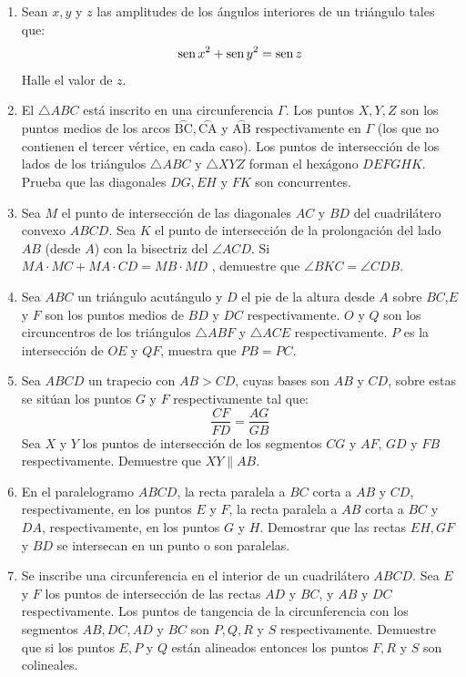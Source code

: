 \documentclass{book}
\newcommand{\sen}{\mathop{\rm sen}\nolimits} %
\begin{document}
\begin{enumerate}
        \item Sean $x,y$ y $z$ las amplitudes de los ángulos interiores de un triángulo tales que:
        $$\sen{x^2}+\sen{y^2}=\sen{z}$$
        Halle el valor de $z$.
        \item El $\triangle ABC$ está inscrito en una circunferencia $\Gamma$. Los puntos $X,Y,Z$ son los puntos medios de los arcos $\stackrel{\textstyle\frown}{\mathrm{BC}},\stackrel{\textstyle\frown}{\mathrm{CA}}$ y  $\stackrel{\textstyle\frown}{\mathrm{AB}}$ respectivamente en $\Gamma$ (los que no contienen el tercer vértice, en cada caso). Los puntos de intersección de los lados de los triángulos $\triangle ABC$ y $\triangle XYZ$ forman el hexágono $DEFGHK$. Prueba que las diagonales $DG,EH$ y $FK$ son concurrentes.
        \item Sea $M$ el punto de intersección de las diagonales $AC$ y $BD$ del cuadrilátero convexo $ABCD$. Sea $K$ el punto de intersección de la prolongación del lado $AB$ (desde $A$) con la bisectriz del $\angle ACD$. Si $MA\cdot MC + MA\cdot CD =MB \cdot MD$ , demuestre que $\angle BKC = \angle CDB$.
        \item Sea $ABC$ un triángulo acutángulo y $D$ el pie de la altura desde $A$ sobre $BC$,$E$ y $F$ son los puntos medios de $BD$ y $DC$ respectivamente. $O$ y $Q$ son los circuncentros de los triángulos $\triangle ABF$ y $\triangle ACE$ respectivamente. $P$ es la intersección de $OE$ y $QF$, muestra que $PB=PC$.
        \item Sea $ABCD$ un trapecio con $AB > CD$, cuyas bases son $AB$ y $CD$, sobre estas se sitúan los puntos $G$ y $F$ respectivamente tal que:
        $$\frac{CF}{FD}=\frac{AG}{GB}$$
        Sea $X$ y $Y$ los puntos de intersección de los segmentos $CG$ y $AF$, $GD$ y $FB$ respectivamente. Demuestre que $XY \parallel AB$.
        \item En el paralelogramo $ABCD$, la recta paralela a $BC$ corta a $AB$ y $CD$, respectivamente, en los puntos $E$ y $F$, la recta paralela a $AB$ corta a $BC$ y $DA$, respectivamente, en los puntos $G$ y $H$. Demostrar que las rectas $EH,GF$ y $BD$ se intersecan en un punto o son paralelas.
        \item Se inscribe una circunferencia en el interior de un cuadrilátero $ABCD$. Sea $E$ y $F$ los puntos de intersección de las rectas $AD$ y $BC$, y $AB$ y $DC$ respectivamente. Los puntos de tangencia de la circunferencia con los segmentos $AB,DC,AD$ y $BC$ son $P,Q,R$ y $S$ respectivamente. Demuestre que si los puntos $E,P$ y $Q$ están alineados entonces los puntos $F,R$ y $S$ son colineales.

\end{enumerate}
\end{document}

